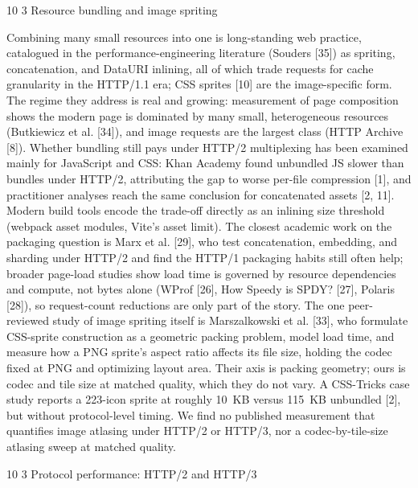 \documentclass[3p,twocolumn]{elsarticle}
\makeatletter
\renewcommand\subsection{\@startsection{subsection}{2}{\z@}%
           {10\p@ \@plus 3\p@ \@minus 3\p@}%
           {3\p@ \@plus 2\p@ \@minus 1\p@}%
           {\normalfont\normalsize\itshape}}
\makeatother
\begin{document}
\subsection{Resource bundling and image
spriting}

Combining many small resources into one is long-standing web practice,
catalogued in the performance-engineering literature (Souders [35])
as spriting, concatenation, and DataURI inlining, all of which trade
requests for cache granularity in the HTTP/1.1 era; CSS sprites [10]
are the image-specific form. The regime they address is real and
growing: measurement of page composition shows the modern page is
dominated by many small, heterogeneous resources (Butkiewicz et al.
[34]), and image requests are the largest class (HTTP Archive
[8]). Whether bundling still pays under HTTP/2 multiplexing has been
examined mainly for JavaScript and CSS: Khan Academy found unbundled JS
slower than bundles under HTTP/2, attributing the gap to worse per-file
compression [1], and practitioner analyses reach the same conclusion
for concatenated assets [2, 11]. Modern build tools encode the
trade-off directly as an inlining size threshold (webpack asset modules,
Vite's asset limit). The closest academic work on the
packaging question is Marx et al. [29], who test concatenation,
embedding, and sharding under HTTP/2 and find the HTTP/1 packaging
habits still often help; broader page-load studies show load time is
governed by resource dependencies and compute, not bytes alone (WProf
[26], How Speedy is SPDY? [27], Polaris [28]), so
request-count reductions are only part of the story. The one
peer-reviewed study of image spriting itself is Marszalkowski et al.
[33], who formulate CSS-sprite construction as a geometric packing
problem, model load time, and measure how a PNG sprite's
aspect ratio affects its file size, holding the codec fixed at PNG and
optimizing layout area. Their axis is packing geometry; ours is codec
and tile size at matched quality, which they do not vary. A CSS-Tricks
case study reports a 223-icon sprite at roughly 10~KB versus 115~KB
unbundled [2], but without protocol-level timing. We find no
published measurement that quantifies image atlasing under HTTP/2 or
HTTP/3, nor a codec-by-tile-size atlasing sweep at matched quality.

\subsection{Protocol performance: HTTP/2 and
HTTP/3}
\end{document}
